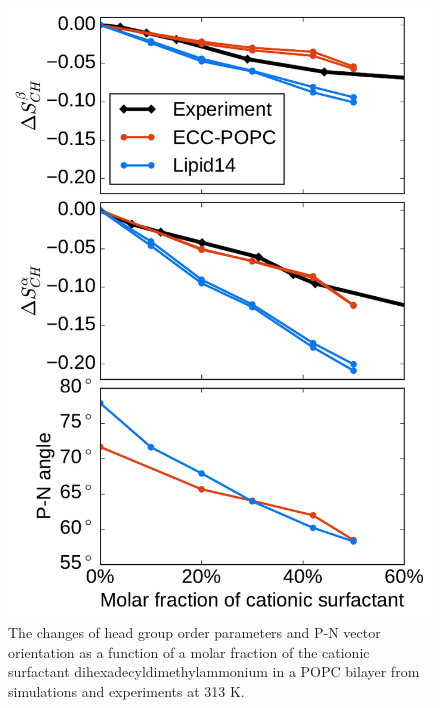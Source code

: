 \begin{figure}[tb!] 
  \centering 
  \includegraphics[width=\figwidth]{../img/ecc_popc/PN_angle_OrdPars-A-B_L14-ECCL17_q80_sig89_surf.pdf} 
  \caption{\label{OrderParameterCHANGESsurf} 
    The changes of head group order parameters and P-N vector orientation as a function of 
    a molar fraction of the cationic surfactant dihexadecyldimethylammonium in a POPC bilayer 
    from simulations and experiments \citep{scherer89} at 313 K.
  } 
\end{figure} 

 

